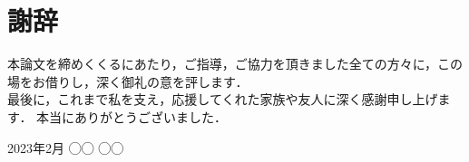 \documentclass[../main]{subfiles}
\begin{document}
\chapter{謝辞}
\label{thankyou}

\thispagestyle{empty}

\newpage


本論文を締めくくるにあたり，ご指導，ご協力を頂きました全ての方々に，この場をお借りし，深く御礼の意を評します．
\\

最後に，これまで私を支え，応援してくれた家族や友人に深く感謝申し上げます．
本当にありがとうございました．

\begin{flushright}
  2023年2月 ◯◯ ◯◯
\end{flushright}

\end{document}
